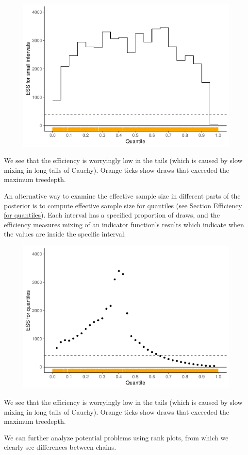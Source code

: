 \documentclass[american,]{article}
\begin{document}
\begin{figure}[tp]
  \centering
  \includegraphics[width=0.6\linewidth]{graphics/local-ess-fit-nom-2-1.pdf}
\end{figure}

We see that the efficiency is worryingly low in the tails (which is
caused by slow mixing in long tails of Cauchy). Orange ticks show draws
that exceeded the maximum treedepth.

An alternative way to examine the effective sample size in different
parts of the posterior is to compute effective sample size for quantiles
(see \protect\hyperlink{quantile_S_eff}{Section Efficiency for
quantiles}). Each interval has a specified proportion of draws, and the
efficiency measures mixing of an indicator function's results which
indicate when the values are inside the specific interval.

\begin{figure}[tp]
  \centering
  \includegraphics[width=0.6\linewidth]{graphics/quantile-ess-fit-nom-2-1.pdf}
\end{figure}

We see that the efficiency is worryingly low in the tails (which is
caused by slow mixing in long tails of Cauchy). Orange ticks show draws
that exceeded the maximum treedepth.

We can further analyze potential problems using rank plots, from which
we clearly see differences between chains.
\end{document}
